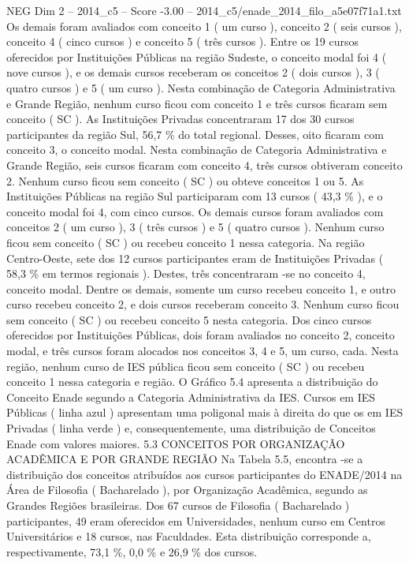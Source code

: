 \begin{textsample}{NEG Dim 2 – 2014\_c5 – Score -3.00 – 2014\_c5/enade\_2014\_filo\_a5e07f71a1.txt}
Os demais foram avaliados com conceito 1 ( um curso ), conceito 2 ( seis cursos ), conceito 4 ( cinco cursos ) e conceito 5 ( três cursos ).
Entre os 19 cursos oferecidos por Instituições Públicas na região Sudeste, o conceito modal foi 4 ( nove cursos ), e os demais cursos receberam os conceitos 2 ( dois cursos ), 3 ( quatro cursos ) e 5 ( um curso ).
Nesta combinação de Categoria Administrativa e Grande Região, nenhum curso ficou com conceito 1 e três cursos ficaram sem conceito ( SC ).
As Instituições Privadas concentraram 17 dos 30 cursos participantes da região Sul, 56,7 \% do total regional.
Desses, oito ficaram com conceito 3, o conceito modal.
Nesta combinação de Categoria Administrativa e Grande Região, seis cursos ficaram com conceito 4, três cursos obtiveram conceito 2.
Nenhum curso ficou sem conceito ( SC ) ou obteve conceitos 1 ou 5.
As Instituições Públicas na região Sul participaram com 13 cursos ( 43,3 \% ), e o conceito modal foi 4, com cinco cursos.
Os demais cursos foram avaliados com conceitos 2 ( um curso ), 3 ( três cursos ) e 5 ( quatro cursos ).
Nenhum curso ficou sem conceito ( SC ) ou recebeu conceito 1 nessa categoria.
Na região Centro-Oeste, sete dos 12 cursos participantes eram de Instituições Privadas ( 58,3 \% em termos regionais ).
Destes, três concentraram -se no conceito 4, conceito modal.
Dentre os demais, somente um curso recebeu conceito 1, e outro curso recebeu conceito 2, e dois cursos receberam conceito 3.
Nenhum curso ficou sem conceito ( SC ) ou recebeu conceito 5 nesta categoria.
Dos cinco cursos oferecidos por Instituições Públicas, dois foram avaliados no conceito 2, conceito modal, e três cursos foram alocados nos conceitos 3, 4 e 5, um curso, cada.
Nesta região, nenhum curso de IES pública ficou sem conceito ( SC ) ou recebeu conceito 1 nessa categoria e região.
O Gráfico 5.4 apresenta a distribuição do Conceito Enade segundo a Categoria Administrativa da IES.
Cursos em IES Públicas ( linha azul ) apresentam uma poligonal mais à direita do que os em IES Privadas ( linha verde ) e, consequentemente, uma distribuição de Conceitos Enade com valores maiores. 5.3 CONCEITOS POR ORGANIZAÇÃO ACADÊMICA E POR GRANDE REGIÃO Na Tabela 5.5, encontra -se a distribuição dos conceitos atribuídos aos cursos participantes do ENADE/2014 na Área de Filosofia ( Bacharelado ), por Organização Acadêmica, segundo as Grandes Regiões brasileiras.
Dos 67 cursos de Filosofia ( Bacharelado ) participantes, 49 eram oferecidos em Universidades, nenhum curso em Centros Universitários e 18 cursos, nas Faculdades.
Esta distribuição corresponde a, respectivamente, 73,1 \%, 0,0 \% e 26,9 \% dos cursos.

\end{textsample}
